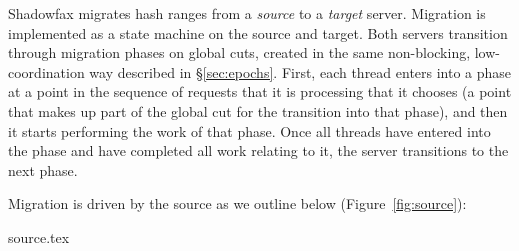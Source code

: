 Shadowfax migrates hash ranges from a \emph{source} to a \emph{target} server.
%
Migration is implemented as a state machine on the source and target.
%
Both servers transition through migration phases on global cuts, created in the
same non-blocking, low-coordination way described in \S\ref{sec:epochs}.
%
First, each thread enters into a phase at a point in the sequence of requests
that it is processing that it chooses (a point that makes up part of the global
cut for the transition into that phase), and then it starts performing the work
of that phase.
%
Once all threads have entered into the phase and have completed all work
relating to it, the server transitions to the next phase.

Migration is driven by the source as we outline below (Figure~\ref{fig:source}):
%
%

 {source.tex}

